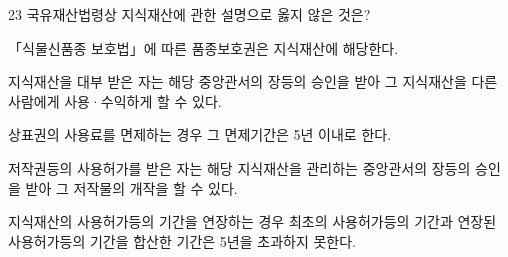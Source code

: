 \begin{question}{23}
국유재산법령상 지식재산에 관한 설명으로 옳지 않은 것은?
\begin{choices}
  \item 「식물신품종 보호법」에 따른 품종보호권은 지식재산에 해당한다.
  \item 지식재산을 대부 받은 자는 해당 중앙관서의 장등의 승인을 받아 그 지식재산을 다른 사람에게 사용·수익하게 할 수 있다.
  \item 상표권의 사용료를 면제하는 경우 그 면제기간은 5년 이내로 한다.
  \item 저작권등의 사용허가를 받은 자는 해당 지식재산을 관리하는 중앙관서의 장등의 승인을 받아 그 저작물의 개작을 할 수 있다.
  \item 지식재산의 사용허가등의 기간을 연장하는 경우 최초의 사용허가등의 기간과 연장된 사용허가등의 기간을 합산한 기간은 5년을 초과하지 못한다.
\end{choices}
\end{question}
